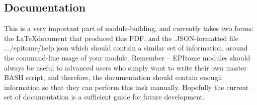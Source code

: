 \documentclass[final,titlepage,letterpaper,oneside,12pt]{article}
\renewcommand{\texttt}[2][BrickRed]{\textcolor{#1}{\ttfamily #2}}%
\begin{document}
\subsection{Documentation}

This is a very important part of module-building, and currently takes two forms: the \LaTeX document that produced this PDF, and the .JSON-formatted file \texttt{.../epitome/help.json} which should contain a similar set of information, around the command-line usage of your module. Remember -- EPItome modules should always be useful to advanced users who simply want to write their own master BASH script, and therefore, the documentation should contain enough information so that they can perform this task manually. Hopefully the current set of documentation is a sufficient guide for future development.

\newpage 


\end{document}
